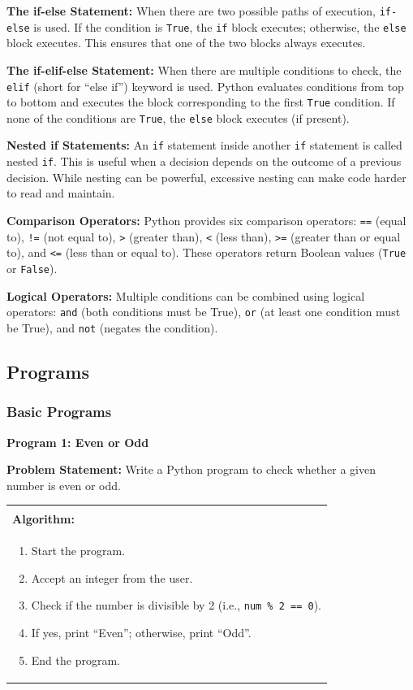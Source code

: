 \documentclass[12pt,a4paper]{article}
\makeatletter
\newenvironment{algobox}{%
  \par\vspace{4pt}%
  \noindent\begin{tabular}{@{}p{\linewidth}@{}}%
  \hline\\[-8pt]%
  \textbf{\color{blue!60!black}\small Algorithm:}\\[2pt]%
}{%
  \\[-4pt]\hline%
  \end{tabular}\par\vspace{4pt}%
}
\makeatother
\begin{document}
\textbf{The if-else Statement:}
When there are two possible paths of execution, \texttt{if-else} is used. If the condition is \texttt{True}, the \texttt{if} block executes; otherwise, the \texttt{else} block executes. This ensures that one of the two blocks always executes.

\textbf{The if-elif-else Statement:}
When there are multiple conditions to check, the \texttt{elif} (short for ``else if'') keyword is used. Python evaluates conditions from top to bottom and executes the block corresponding to the first \texttt{True} condition. If none of the conditions are \texttt{True}, the \texttt{else} block executes (if present).

\textbf{Nested if Statements:}
An \texttt{if} statement inside another \texttt{if} statement is called nested \texttt{if}. This is useful when a decision depends on the outcome of a previous decision. While nesting can be powerful, excessive nesting can make code harder to read and maintain.

\textbf{Comparison Operators:} Python provides six comparison operators: \texttt{==} (equal to), \texttt{!=} (not equal to), \texttt{>} (greater than), \texttt{<} (less than), \texttt{>=} (greater than or equal to), and \texttt{<=} (less than or equal to). These operators return Boolean values (\texttt{True} or \texttt{False}).

\textbf{Logical Operators:} Multiple conditions can be combined using logical operators: \texttt{and} (both conditions must be True), \texttt{or} (at least one condition must be True), and \texttt{not} (negates the condition).

\subsection{Programs}
\subsubsection{Basic Programs}

\textbf{Program 1: Even or Odd}

\textbf{Problem Statement:}
Write a Python program to check whether a given number is even or odd.

\begin{algobox}
\begin{enumerate}[label=Step \arabic*:]
  \item Start the program.
  \item Accept an integer from the user.
  \item Check if the number is divisible by 2 (i.e., \texttt{num \% 2 == 0}).
  \item If yes, print ``Even''; otherwise, print ``Odd''.
  \item End the program.
\end{enumerate}
\end{algobox}
\end{document}
